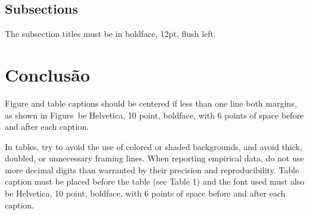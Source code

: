 \documentclass[12pt]{article}
\begin{document}
\subsection{Subsections}

The subsection titles must be in boldface, 12pt, flush left.

\section{Conclusão}\label{sec:figs}

Figure and table captions should be centered if less than one line
both margins, as shown in Figure~be Helvetica, 10 point, boldface, with 6
points of space before and after each caption.%



In tables, try to avoid the use of colored or shaded backgrounds, and avoid
thick, doubled, or unnecessary framing lines. When reporting empirical data, do
not use more decimal digits than warranted by their precision and
reproducibility. Table caption must be placed before the table (see Table 1)
and the font used must also be Helvetica, 10 point, boldface, with 6 points of
space before and after each caption.




\end{document}
